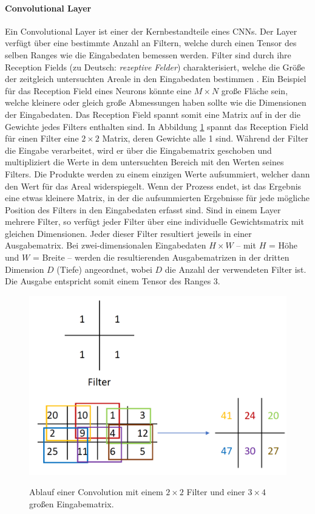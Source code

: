 \paragraph{Convolutional Layer}

Ein Convolutional Layer ist einer der Kernbestandteile eines CNNs. Der Layer verfügt über eine bestimmte Anzahl an Filtern, welche durch einen Tensor des selben Ranges wie die Eingabedaten bemessen werden. Filter sind durch ihre Reception Fields (zu Deutsch: \textit{rezeptive Felder}) charakterisiert, welche die Größe der zeitgleich untersuchten Areale in den Eingabedaten bestimmen \parencite{DBLP:journals/corr/OSheaN15}. Ein Beispiel für das Reception Field eines Neurons könnte eine $M \times N$ große Fläche sein, welche kleinere oder gleich große Abmessungen haben sollte wie die Dimensionen der Eingabedaten. Das Reception Field spannt somit eine Matrix auf in der die Gewichte jedes Filters enthalten sind. In Abbildung \ref{fig:convbsp} spannt das Reception Field für einen Filter eine $2 \times 2$ Matrix, deren Gewichte alle 1 sind. Während der Filter die Eingabe verarbeitet, wird er über die Eingabematrix geschoben und multipliziert die Werte in dem untersuchten Bereich mit den Werten seines Filters. Die Produkte werden zu einem einzigen Werte aufsummiert, welcher dann den Wert für das Areal widerspiegelt. Wenn der Prozess endet, ist das Ergebnis eine etwas kleinere Matrix, in der die aufsummierten Ergebnisse für jede mögliche Position des Filters in den Eingabedaten erfasst sind. Sind in einem Layer mehrere Filter, so verfügt jeder Filter über eine individuelle Gewichtsmatrix mit gleichen Dimensionen. Jeder dieser Filter resultiert jeweils in einer Ausgabematrix. Bei zwei-dimensionalen Eingabedaten $H \times W$ -- mit $H$ = Höhe und $W$ = Breite -- werden die resultierenden Ausgabematrizen in der dritten Dimension $D$ (Tiefe) angeordnet, wobei $D$ die Anzahl der verwendeten Filter ist. Die Ausgabe entspricht somit einem Tensor des Ranges 3.  

\begin{figure}[H]
\centering
\includegraphics[scale=0.4]{pictures/grafiken/conv-bsp}
\label{fig:convbsp}
\caption{Ablauf einer Convolution mit einem $2 \times 2$ Filter und einer $3 \times 4$ großen Eingabematrix.}
\end{figure}

